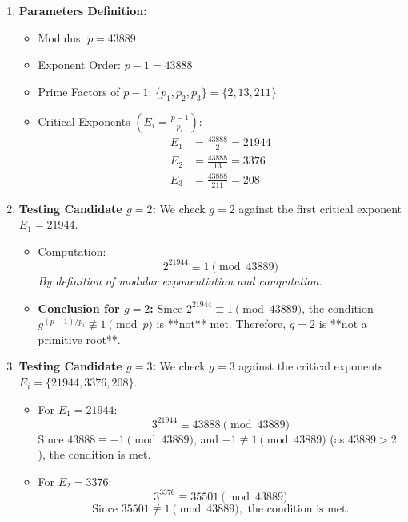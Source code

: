 \begin{solution}
    \begin{enumerate}
        \item \textbf{Parameters Definition:}
        \begin{itemize}
            \item Modulus: $p = 43889$
            \item Exponent Order: $p-1 = 43888$
            \item Prime Factors of $p-1$: $\{p_1, p_2, p_3\} = \{2, 13, 211\}$
            \item Critical Exponents $\left(E_i = \frac{p-1}{p_i}\right)$:
            \begin{align*}
                E_1 &= \frac{43888}{2} = 21944 \\
                E_2 &= \frac{43888}{13} = 3376 \\
                E_3 &= \frac{43888}{211} = 208
            \end{align*}
        \end{itemize}
    
        \item \textbf{Testing Candidate $g=2$:}
        We check $g=2$ against the first critical exponent $E_1=21944$.
    
        \begin{itemize}
            \item Computation:
            $$2^{21944} \equiv 1 \pmod{43889}$$
            \textit{By definition of modular exponentiation and computation.}
            
            \item \textbf{Conclusion for $g=2$:} Since $2^{21944} \equiv 1 \pmod{43889}$, the condition $g^{(p-1)/p_i} \not\equiv 1 \pmod{p}$ is **not** met. Therefore, $g=2$ is **not a primitive root**.
        \end{itemize}
    
        \item \textbf{Testing Candidate $g=3$:}
        We check $g=3$ against the critical exponents $E_i = \{21944, 3376, 208\}$.\\
    
        \begin{itemize}
            \item For $E_1=21944$:
            $$3^{21944} \equiv 43888 \pmod{43889}$$
            Since $43888 \equiv -1 \pmod{43889}$, and $-1 \not\equiv 1 \pmod{43889}$ (as $43889 > 2$), the condition is met.
    
            \item For $E_2=3376$:
            $$3^{3376} \equiv 35501 \pmod{43889}$$
            $$\text{Since } 35501 \not\equiv 1 \pmod{43889}, \text{ the condition is met.}$$
    

\end{itemize}
\end{enumerate}
\end{solution}
